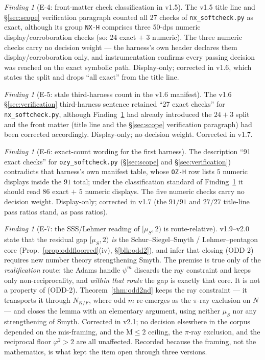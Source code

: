 \documentclass[11pt]{article}
\newcommand{\hx}[1]{\textcolor{cC}{\footnotesize\texttt{#1}}}
\newcommand{\gp}{\varphi}
\newcommand{\M}{\mathrm{M}}
\theoremstyle{plain}
\theoremstyle{definition}
\theoremstyle{remark}
\newtheorem{finding}[theorem]{Finding}
\begin{document}
\begin{finding}[E-4: front-matter check classification in v1.5]\label{find:hcount}
The v1.5 title line and \S\ref{sec:scope} verification paragraph counted
all $27$ checks of \texttt{nx\_softcheck.py} as exact, although its group
\hx{NX-H} comprises three 50-dps numeric display/corroboration checks
(so: $24$ exact $+$ $3$ numeric). The three numeric checks carry no
decision weight --- the harness's own header declares them
display/corroboration only, and instrumentation confirms every passing
decision was reached on the exact symbolic path. Display-only; corrected
in v1.6, which states the split and drops ``all exact'' from the title
line.
\end{finding}

\begin{finding}[E-5: stale third-harness count in the v1.6 manifest]\label{find:manifeststale}
The v1.6 \S\ref{sec:verification} third-harness sentence retained ``27
exact checks'' for \texttt{nx\_softcheck.py}, although
Finding~\ref{find:hcount} had already introduced the $24+3$ split and the
front matter (title line and the \S\ref{sec:scope} verification paragraph)
had been corrected accordingly. Display-only; no decision weight.
Corrected in v1.7.
\end{finding}

\begin{finding}[E-6: exact-count wording for the first harness]\label{find:ozsplit}
The description ``91 exact checks'' for \texttt{ozy\_softcheck.py}
(\S\ref{sec:scope} and \S\ref{sec:verification}) contradicts that
harness's own manifest table, whose \hx{OZ-H} row lists $5$ numeric
displays inside the $91$ total; under the classification standard of
Finding~\ref{find:hcount} it should read $86$ exact $+$ $5$ numeric
displays. The five numeric checks carry no decision weight. Display-only;
corrected in v1.7 (the $91/91$ and $27/27$ title-line pass ratios stand,
as pass ratios).
\end{finding}

\begin{finding}[E-7: the SSS/Lehmer reading of $[\mu_S,2)$ is route-relative]\label{find:sssframe}
v1.9--v2.0 state that the residual gap $[\mu_S,2)$ \emph{is} the
Schur--Siegel--Smyth / Lehmer--pentagon core (Prop.~\ref{prop:oddfloorred}(iv),
\S\ref{blk:odd2}), and infer that closing (ODD-2) requires new number theory
strengthening Smyth. The premise is true only of the \emph{realification}
route: the Adams handle $\psi^m$ discards the ray constraint and keeps only
non-reciprocality, and \emph{within that route} the gap is exactly that core.
It is not a property of (ODD-2). Theorem~\ref{thm:odd2nd} keeps the ray
constraint --- it transports it through $N_{K/F}$, where odd $m$ re-emerges as
the $\pi$-ray exclusion on $N$ --- and closes the lemma with an elementary
argument, using neither $\mu_S$ nor any strengthening of Smyth. Corrected in
v2.1; no decision elsewhere in the corpus depended on the mis-framing, and the
$\M\le2$ ceiling, the $\pi$-ray exclusion, and the reciprocal floor $\gp^2>2$
are all unaffected. Recorded because the framing, not the mathematics, is what
kept the item open through three versions.
\end{finding}
\end{document}
